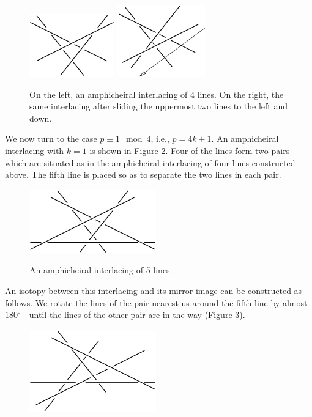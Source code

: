 \documentclass{article}
\begin{document}
\begin{figure}
{\includegraphics{imagesSkewlines/x17.png}}
{\includegraphics{imagesSkewlines/x18.png}}
\caption{On the left, an amphicheiral interlacing of 4 lines. 
On the right, the same interlacing after sliding the uppermost two lines to 
the left and down.} \label{f18}
\end{figure}


We now turn to the case $p\equiv 1 \mod4$, i.e., $p=4k+1$. 
An amphicheiral
interlacing with $k=1$ is shown in Figure \ref{f19}. Four of the lines 
form two pairs
which are situated as in the amphicheiral interlacing of four lines constructed
above. The fifth line is placed so as to separate the two lines in 
each pair. 
\begin{figure}
{\includegraphics{imagesSkewlines/x19.png}}
\caption{An amphicheiral interlacing of 5 lines.}
\label{f19}
\end{figure}

An isotopy between this interlacing and its mirror image can be constructed as
follows. We rotate the lines of the pair nearest us around the fifth line by
almost $180^\circ$---until the lines of the other pair are in the way (Figure
\ref{f20}). 
\begin{figure}
{\includegraphics{imagesSkewlines/x20.png}}
\caption{}
\label{f20}
\end{figure}
\end{document}
